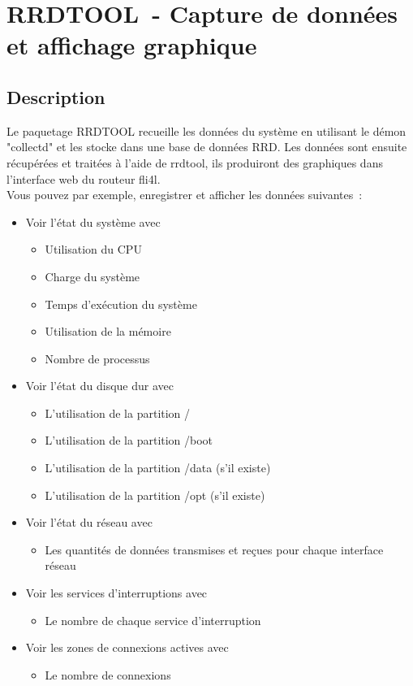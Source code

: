 
\section {RRDTOOL~- Capture de données et affichage graphique}

\subsection {Description}

Le paquetage RRDTOOL recueille les données du système en utilisant le démon
"collectd" et les stocke dans une base de données RRD. Les données sont ensuite
récupérées et traitées à l'aide de rrdtool, ils produiront des graphiques dans
l'interface web du routeur fli4l.
\\
Vous pouvez par exemple, enregistrer et afficher les données suivantes~:
 \begin{itemize}
  \item Voir l'état du système avec
  \begin{itemize}
   \item Utilisation du CPU
   \item Charge du système
   \item Temps d'exécution du système
   \item Utilisation de la mémoire
   \item Nombre de processus
  \end{itemize}
  \item Voir l'état du disque dur avec
   \begin{itemize}
   \item L'utilisation de la partition /
   \item L'utilisation de la partition /boot
   \item L'utilisation de la partition /data (s'il existe)
   \item L'utilisation de la partition /opt (s'il existe)
  \end{itemize}
  \item Voir l'état du réseau avec
  \begin{itemize}
   \item Les quantités de données transmises et reçues pour chaque interface réseau
  \end{itemize}
  \item Voir les services d'interruptions avec
  \begin{itemize}
   \item Le nombre de chaque service d'interruption
  \end{itemize}
  \item Voir les zones de connexions actives avec
  \begin{itemize}
   \item Le nombre de connexions
  \end{itemize}
 \end{itemize}

